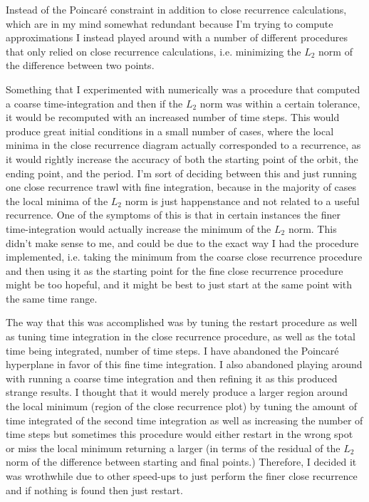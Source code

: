 Instead of the Poincar\'e constraint in addition to close recurrence calculations, which
are in my mind somewhat redundant because I'm trying to compute approximations I instead
played around with a number of different procedures that only relied on close recurrence
calculations, i.e. minimizing the $L_2$ norm of the difference between two {\statesp} points.

Something that I experimented with numerically was a procedure that computed a coarse time-integration
and then if the $L_2$ norm was within a certain tolerance, it would be recomputed with an increased number
of time steps. This would produce great initial conditions in a small number of cases, where the local minima in the
close recurrence diagram actually corresponded to a recurrence, as it would rightly increase the accuracy of both
the starting point of the orbit, the ending point, and the period. I'm sort of deciding between this
and just running one close recurrence trawl with fine integration, because in the majority of cases the
local minima of the $L_2$ norm is just happenstance and not related to a useful recurrence. One of the
symptoms of this is that in certain instances the finer time-integration would actually increase
the minimum of the $L_2$ norm. This didn't make sense to me, and could be due to the exact way I had the
procedure implemented, i.e. taking the minimum from the coarse close recurrence procedure and then
using it as the starting point for the fine close recurrence procedure might be too hopeful, and it might
be best to just start at the same point with the same time range.

The way that this was accomplished was by tuning the restart procedure as
well as tuning time integration in the close recurrence procedure, as
well as the total time being integrated, number of time steps. I have
abandoned the Poincar\'e hyperplane in favor of this fine time
integration. I also abandoned playing around with running a coarse time
integration and then refining it as this produced strange results. I
thought that it would merely produce a larger region around the local
minimum (region of the close recurrence plot) by tuning the amount of
time integrated of the second time integration as well as increasing the
number of time steps but sometimes this procedure would either restart in
the wrong spot or miss the local minimum returning a larger (in terms of
the residual of the $L_2$ norm of the difference between starting and
final points.) Therefore, I decided it was wrothwhile due to other
speed-ups to just perform the finer close recurrence and if nothing is
found then just restart.

